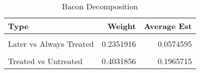\begin{table}[!h]

\caption{\label{tab:BDec}Bacon Decomposition}
\centering
\begin{tabular}[t]{lrr}
\toprule
Type & Weight & Average Est\\
\midrule
\cellcolor{gray!6}{Earlier vs Later Treated} & \cellcolor{gray!6}{0.2742302} & \cellcolor{gray!6}{0.0021544}\\
Later vs Always Treated & 0.2351916 & 0.0574595\\
\cellcolor{gray!6}{Later vs Earlier Treated} & \cellcolor{gray!6}{0.0873926} & \cellcolor{gray!6}{0.0446130}\\
Treated vs Untreated & 0.4031856 & 0.1965715\\
\bottomrule
\end{tabular}
\end{table}

